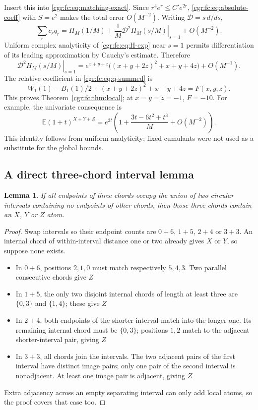 \documentclass[11pt,letterpaper]{article}
\numberwithin{equation}{section}
\newtheorem{lemma}[theorem]{Lemma}
\theoremstyle{definition}\newtheorem{definition}[theorem]{Definition}
\theoremstyle{remark}\newtheorem{remark}[theorem]{Remark}
\newcommand{\EE}{\mathbb E}
\begin{document}
Insert this into \eqref{cgr:fc:eq:matching-exact}. Since
$r^4e^r\le C'e^{2r}$, \eqref{cgr:fc:eq:absolute-coeff} with $S=e^2$
makes the total error $O(M^{-2})$. Writing $\mathcal D=s\,d/ds$,
\begin{equation}\label{cgr:fc:eq:q-summed}
 \sum_rc_rq_r=H_M(1/M)+\frac1M
       \left.\mathcal D^2H_M(s/M)\right|_{s=1}+O(M^{-2}).
\end{equation}
Uniform complex analyticity of \eqref{cgr:fc:eq:H-exp} near $s=1$
permits differentiation of its leading approximation by Cauchy's
estimate. Therefore
\[
 \left.\mathcal D^2H_M(s/M)\right|_{s=1}
 =e^{x+y+z}\bigl((x+y+2z)^2+x+y+4z\bigr)+O(M^{-1}).
\]
The relative coefficient in \eqref{cgr:fc:eq:q-summed} is
\[
 W_1(1)-B_1(1)/2+(x+y+2z)^2+x+y+4z=F(x,y,z).
\]
This proves Theorem~\ref{cgr:fc:thm:local}; at $x=y=z=-1$, $F=-10$.
For example, the univariate consequence is
\[
 \EE(1+t)^{X+Y+Z}
 =e^{3t}\left(1+\frac{3t-6t^2+t^3}M+O(M^{-2})\right).
\]
This identity follows from uniform analyticity; fixed cumulants
were not used as a substitute for the global bounds.

\subsection{A direct three-chord interval lemma}
\begin{lemma}\label{cgr:fc:lem:three}
If all endpoints of three chords occupy the union of two circular
intervals containing no endpoints of other chords, then those
three chords contain an $X$, $Y$ or $Z$ atom.
\end{lemma}
\begin{proof}
Swap intervals so their endpoint counts are $0+6$, $1+5$,
$2+4$ or $3+3$. An internal chord of within-interval distance
one or two already gives $X$ or $Y$, so suppose none exists.
\begin{itemize}
\item In $0+6$, positions $2,1,0$ must match respectively
$5,4,3$. Two parallel consecutive chords give $Z$
\item In $1+5$, the only two disjoint internal chords of length
at least three are $\{0,3\}$ and $\{1,4\}$; these give $Z$
\item In $2+4$, both endpoints of the shorter interval match into
the longer one. Its remaining internal chord must be $\{0,3\}$;
positions $1,2$ match to the adjacent shorter-interval pair,
giving $Z$
\item In $3+3$, all chords join the intervals. The two adjacent
pairs of the first interval have distinct image pairs; only one
pair of the second interval is nonadjacent. At least one image
pair is adjacent, giving $Z$
\end{itemize}
Extra adjacency across an empty separating interval can only add
local atoms, so the proof covers that case too.
\end{proof}
\end{document}
